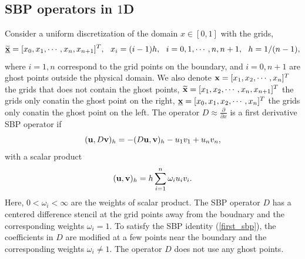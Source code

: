 \documentclass[a4paper]{article}
\newcommand{\wt}{\widetilde}
\begin{document}
\subsection{SBP operators in $1$D}
Consider a uniform discretization of the domain $x\in[0,1]$ with the grids,
\[\uline{\wt
{{\bf x}}} = [x_0,x_1,\cdots,x_n,x_{n+1}]^T,\ \  x_i = (i-1)h,\ \ i = 0,1,\cdots,n,n+1,\ \ h = 1/(n-1),\]
where $i = 1,n$ correspond to the grid points on the boundary, and $i = 0,n+1$ are ghost points outside the physical domain.
We also denote ${\bf x} = [x_1,x_2,\cdots,x_n]^T$ the grids that does not  contain the ghost points, $\wt{{\bf x}} = [x_1,x_2,\cdots,x_n,x_{n+1}]^T$ the grids only conatin the ghost point on the right, $\uline{{\bf x}} = [x_0,x_1,x_2,\cdots,x_n]^T$ the grids only conatin the ghost point on the left. The  operator $D \approx \frac{\partial }{\partial x}$ is a first derivative SBP operator if 
\begin{equation}\label{first_sbp}
({\bf u}, D{\bf v})_h = -(D{\bf u},{\bf v})_h - u_1v_1 + u_nv_n,
\end{equation}
with a scalar product
\begin{equation}\label{inner_product}
({\bf u},{\bf v})_h = h\sum_{i = 1}^{n}\omega_iu_iv_i.
\end{equation}
Here, $0<\omega_i < \infty $ are the weights of scalar product. The SBP operator $D$ has a centered difference stencil at the grid points away from the boudnary and the corresponding weights $\omega_i = 1$. To satisfy the SBP identity (\ref{first_sbp}), the coefficients in $D$ are  modified at a few points near the boundary and the corresponding weights $\omega_i \neq 1$. The operator $D$ does not use any ghost points. 
\end{document}
